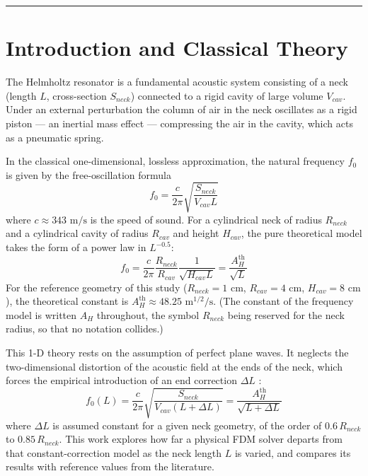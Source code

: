\documentclass[11pt,a4paper,twocolumn]{article}
\begin{document}
\vspace{0.4em}
\begingroup
\setcounter{tocdepth}{1}
\renewcommand{\contentsname}{\normalsize\color{accent}\textbf{Contents}}
{\small\tableofcontents}
\endgroup
\vspace{0.4em}
\hrule
\vspace{0.8em}

\section{Introduction and Classical Theory}
The Helmholtz resonator is a fundamental acoustic system \cite{helmholtz1860} consisting of a neck (length $L$, cross-section $S_{neck}$) connected to a rigid cavity of large volume $V_{cav}$. Under an external perturbation the column of air in the neck oscillates as a rigid piston --- an inertial mass effect --- compressing the air in the cavity, which acts as a pneumatic spring.

In the classical one-dimensional, lossless approximation, the natural frequency $f_0$ is given by the free-oscillation formula
\begin{equation}
\label{eq:helmholtz_1d_pure}
f_0 = \frac{c}{2\pi} \sqrt{\frac{S_{neck}}{V_{cav} L}}
\end{equation}
where $c \approx 343\text{ m/s}$ is the speed of sound. For a cylindrical neck of radius $R_{neck}$ and a cylindrical cavity of radius $R_{cav}$ and height $H_{cav}$, the pure theoretical model takes the form of a power law in $L^{-0.5}$:
\begin{equation}
f_0 = \frac{c}{2\pi} \frac{R_{neck}}{R_{cav}} \frac{1}{\sqrt{H_{cav} L}} = \frac{A_H^{\mathrm{th}}}{\sqrt{L}}
\end{equation}
For the reference geometry of this study ($R_{neck}=1\text{ cm}$, $R_{cav}=4\text{ cm}$, $H_{cav}=8\text{ cm}$), the theoretical constant is $A_H^{\mathrm{th}} \approx 48.25\text{ m}^{1/2}/\text{s}$. (The constant of the frequency model is written $A_H$ throughout, the symbol $R_{neck}$ being reserved for the neck radius, so that no notation collides.)

This 1-D theory rests on the assumption of perfect plane waves. It neglects the two-dimensional distortion of the acoustic field at the ends of the neck, which forces the empirical introduction of an end correction $\Delta L$ \cite{rayleigh1896, peters2003end}:
\begin{equation}
\label{eq:helmholtz_correction}
f_0(L) = \frac{c}{2\pi} \sqrt{\frac{S_{neck}}{V_{cav} (L + \Delta L)}} = \frac{A_H^{\mathrm{th}}}{\sqrt{L + \Delta L}}
\end{equation}
where $\Delta L$ is assumed constant for a given neck geometry, of the order of $0.6 \, R_{neck}$ to $0.85 \, R_{neck}$. This work explores how far a physical FDM solver departs from that constant-correction model as the neck length $L$ is varied, and compares its results with reference values from the literature.
\end{document}

